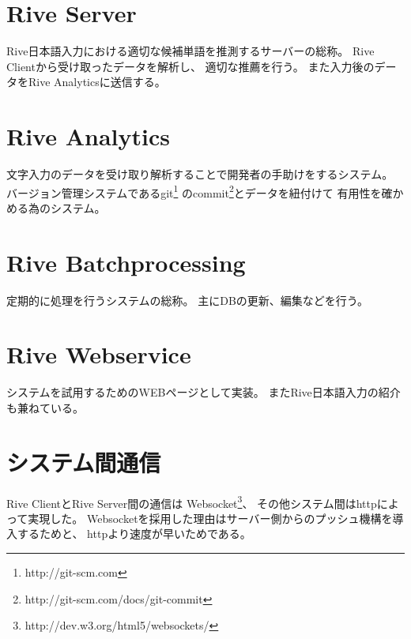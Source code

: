 \section{Rive Server}
Rive日本語入力における適切な候補単語を推測するサーバーの総称。
Rive Clientから受け取ったデータを解析し、
適切な推薦を行う。
また入力後のデータをRive Analyticsに送信する。

\section{Rive Analytics}
文字入力のデータを受け取り解析することで開発者の手助けをするシステム。
バージョン管理システムであるgit\footnote{http://git-scm.com}
のcommit\footnote{http://git-scm.com/docs/git-commit}とデータを紐付けて
有用性を確かめる為のシステム。

\section{Rive Batchprocessing}
定期的に処理を行うシステムの総称。
主にDBの更新、編集などを行う。

\section{Rive Webservice}
システムを試用するためのWEBページとして実装。
またRive日本語入力の紹介も兼ねている。

\section{システム間通信}
Rive ClientとRive Server間の通信は
Websocket\footnote{http://dev.w3.org/html5/websockets/}、
その他システム間はhttpによって実現した。
Websocketを採用した理由はサーバー側からのプッシュ機構を導入するためと、
httpより速度が早いためである。\cite{websocket}
